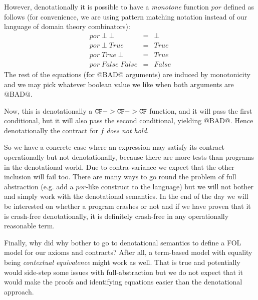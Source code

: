However, denotationally it is possible to have a {\em monotone} function $por$ defined as follows (for convenience, 
we are using pattern matching notation instead of our language of domain theory combinators):
\[\begin{array}{lcl}
  por\;\bot\;\bot & = & \bot \\ 
  por\;\bot\;True & = & True \\
  por\;True\;\bot & = & True \\ 
  por\;False\;False & = & False
\end{array}\] 
The rest of the equations (for @BAD@ arguments) are induced by monotonicity and we may pick whatever boolean value 
we like when both arguments are @BAD@. 

Now, this is denotationally a ${\tt CF} -> {\tt CF} -> {\tt CF}$ function, and it will pass the first conditional, but it will
also pass the second conditional, yielding @BAD@. Hence denotationally the contract for $f$ {\em does not hold}.

So we have a concrete case where an expression may satisfy its contract operationally but not denotationally, 
because there are more tests than programs in the denotational world. Due to contra-variance we expect that the 
other inclusion will fail too. There are many ways to go round the problem of full abstraction (e.g. add a $por$-like 
construct to the language) but we will not bother and simply work with the denotational semantics. In the end of 
the day we will be interested on whether a program crashes or not and if we have proven that it is crash-free 
denotationally, it is definitely crash-free in any operationally reasonable term. 

Finally, why did why bother to go to denotational semantics to define a FOL model for our 
axioms and contracts? After all, a term-based model with equality being {\em contextual 
equivalence} might work as well. That is true and potentially would side-step some issues with 
full-abstraction but we do not expect that it would make the proofs and identifying equations
easier than the denotational approach. 


